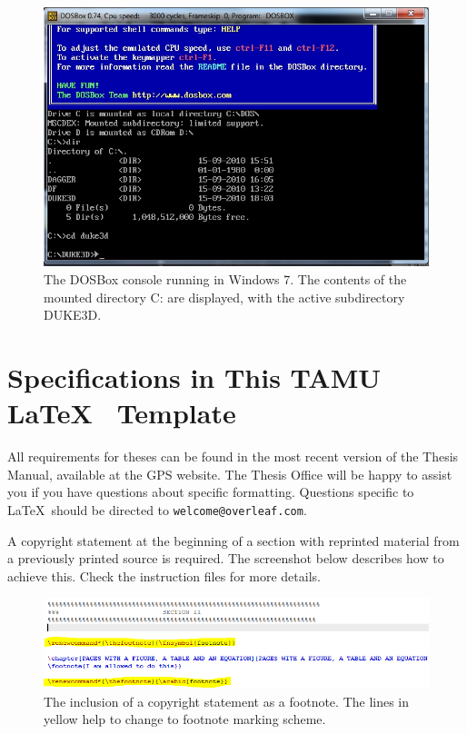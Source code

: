 \begin{figure}[ht!]
	\centering
	\includegraphics[scale=0.55]{images/DOSBox1.jpg}
	\caption{The DOSBox console running in Windows 7. The contents of the mounted directory C: are displayed, with the active subdirectory DUKE3D.}
\end{figure}

\section{Specifications in This TAMU \LaTeX ~ Template}

All requirements for theses can be found in the most recent version of the Thesis Manual, available at the GPS website. The Thesis Office will be happy to assist you if you have questions about specific formatting. Questions specific to \LaTeX\ should be directed to \texttt{welcome@overleaf.com}.

A copyright statement at the beginning of a section with reprinted material from a previously printed source is required. The screenshot below describes how to achieve this. Check the instruction files for more details.

\begin{figure}[ht!]
	\centering
	\includegraphics[scale=0.65]{images/Footnote.png}
	\caption{The inclusion of a copyright statement as a footnote. The lines in yellow help to change to footnote marking scheme.}
\end{figure}

